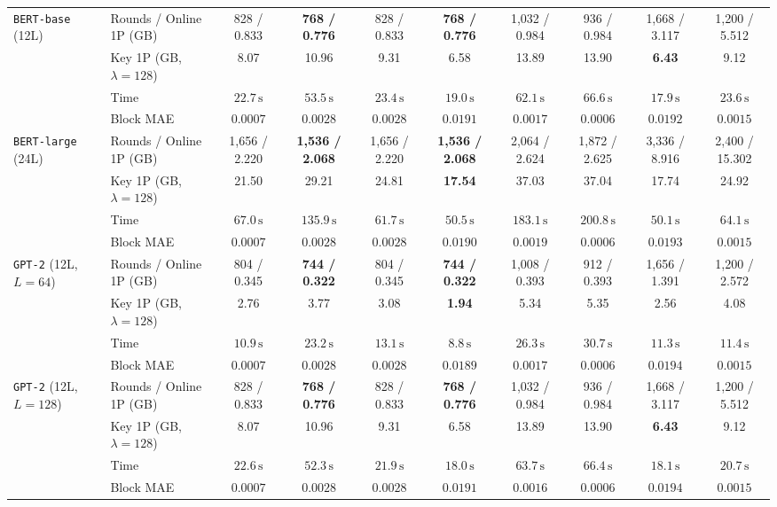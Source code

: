 \begin{tabular}{@{}llcccccccc@{}}
\midrule
\multirow{4}{*}{\texttt{BERT-base} (12L)}
 & Rounds / Online 1P (GB) & 828 / 0.833 & \textbf{768 / 0.776} & 828 / 0.833 & \textbf{768 / 0.776} & 1,032 / 0.984 & 936 / 0.984 & 1,668 / 3.117 & 1,200 / 5.512 \\
 & Key 1P (GB, $\lambda{=}128$) & 8.07 & 10.96 & 9.31 & 6.58 & 13.89 & 13.90 & \textbf{6.43} & 9.12 \\
 & Time & $22.7\,\text{s}$ & $53.5\,\text{s}$ & $23.4\,\text{s}$ & $19.0\,\text{s}$ & $62.1\,\text{s}$ & $66.6\,\text{s}$ & \textbf{$17.9\,\text{s}$} & $23.6\,\text{s}$ \\
 & Block MAE & $0.0007$ & $0.0028$ & $0.0028$ & $0.0191$ & $0.0017$ & \textbf{$0.0006$} & $0.0192$ & $0.0015$ \\
\midrule
\multirow{4}{*}{\texttt{BERT-large} (24L)}
 & Rounds / Online 1P (GB) & 1,656 / 2.220 & \textbf{1,536 / 2.068} & 1,656 / 2.220 & \textbf{1,536 / 2.068} & 2,064 / 2.624 & 1,872 / 2.625 & 3,336 / 8.916 & 2,400 / 15.302 \\
 & Key 1P (GB, $\lambda{=}128$) & 21.50 & 29.21 & 24.81 & \textbf{17.54} & 37.03 & 37.04 & 17.74 & 24.92 \\
 & Time & $67.0\,\text{s}$ & $135.9\,\text{s}$ & $61.7\,\text{s}$ & $50.5\,\text{s}$ & $183.1\,\text{s}$ & $200.8\,\text{s}$ & \textbf{$50.1\,\text{s}$} & $64.1\,\text{s}$ \\
 & Block MAE & $0.0007$ & $0.0028$ & $0.0028$ & $0.0190$ & $0.0019$ & \textbf{$0.0006$} & $0.0193$ & $0.0015$ \\
\midrule
\multirow{4}{*}{\texttt{GPT-2} (12L, $L{=}64$)}
 & Rounds / Online 1P (GB) & 804 / 0.345 & \textbf{744 / 0.322} & 804 / 0.345 & \textbf{744 / 0.322} & 1,008 / 0.393 & 912 / 0.393 & 1,656 / 1.391 & 1,200 / 2.572 \\
 & Key 1P (GB, $\lambda{=}128$) & 2.76 & 3.77 & 3.08 & \textbf{1.94} & 5.34 & 5.35 & 2.56 & 4.08 \\
 & Time & $10.9\,\text{s}$ & $23.2\,\text{s}$ & $13.1\,\text{s}$ & \textbf{$8.8\,\text{s}$} & $26.3\,\text{s}$ & $30.7\,\text{s}$ & $11.3\,\text{s}$ & $11.4\,\text{s}$ \\
 & Block MAE & $0.0007$ & $0.0028$ & $0.0028$ & $0.0189$ & $0.0017$ & \textbf{$0.0006$} & $0.0194$ & $0.0015$ \\
\midrule
\multirow{4}{*}{\texttt{GPT-2} (12L, $L{=}128$)}
 & Rounds / Online 1P (GB) & 828 / 0.833 & \textbf{768 / 0.776} & 828 / 0.833 & \textbf{768 / 0.776} & 1,032 / 0.984 & 936 / 0.984 & 1,668 / 3.117 & 1,200 / 5.512 \\
 & Key 1P (GB, $\lambda{=}128$) & 8.07 & 10.96 & 9.31 & 6.58 & 13.89 & 13.90 & \textbf{6.43} & 9.12 \\
 & Time & $22.6\,\text{s}$ & $52.3\,\text{s}$ & $21.9\,\text{s}$ & \textbf{$18.0\,\text{s}$} & $63.7\,\text{s}$ & $66.4\,\text{s}$ & $18.1\,\text{s}$ & $20.7\,\text{s}$ \\
 & Block MAE & $0.0007$ & $0.0028$ & $0.0028$ & $0.0191$ & $0.0016$ & \textbf{$0.0006$} & $0.0194$ & $0.0015$ \\
\bottomrule
\end{tabular}
